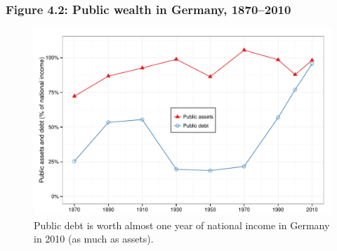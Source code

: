 \documentclass[t]{beamer}\usepackage[]{graphicx}\usepackage[]{color}
\newenvironment{knitrout}{}{} %
\begin{document}
\begin{frame}[label=Figure_4_2]
\frametitle{Figure 4.2: Public wealth in Germany, 1870--2010}
\begin{figure}[t]
\begin{minipage}[b]{\textwidth}
\centering
\begin{knitrout}\footnotesize
{}\color{fgcolor}

{\centering \includegraphics[width=1\linewidth]{figures/color/Figure_4_2} 

}



\end{knitrout}
\caption{Public debt is worth almost one year of national income in Germany in 2010 (as much as assets).}
\end{minipage}
\end{figure}
\end{frame}
\end{document}
